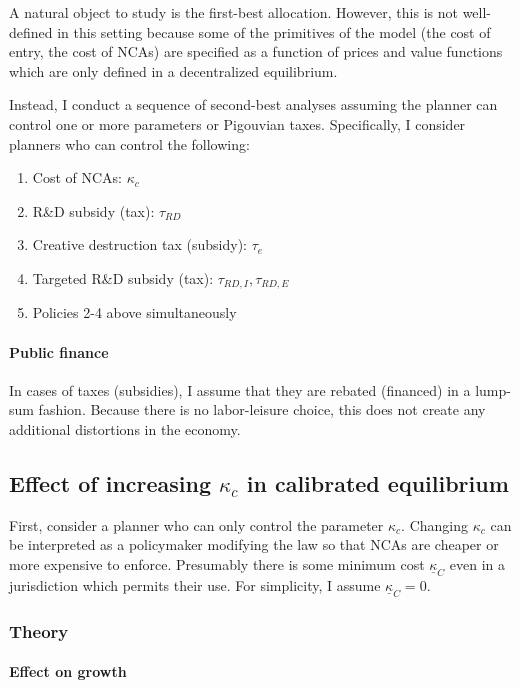\documentclass[11pt,english]{article}
\theoremstyle{remark}
\begin{document}
A natural object to study is the first-best allocation. However, this is not well-defined in this setting because some of the primitives of the model (the cost of entry, the cost of NCAs) are specified as a function of prices and value functions which are only defined in a decentralized equilibrium.

Instead, I conduct a sequence of second-best analyses assuming the planner can control one or more parameters or Pigouvian taxes. Specifically, I consider planners who can control the following: 

\begin{enumerate}
	\item Cost of NCAs: $\kappa_c$ 
	\item R\&D subsidy (tax): $\tau_{RD}$
	\item Creative destruction tax (subsidy): $\tau_e$
	\item Targeted R\&D subsidy (tax): $\tau_{RD,I}, \tau_{RD,E}$
	\item Policies 2-4 above simultaneously
\end{enumerate}

\paragraph{Public finance} 

In cases of taxes (subsidies), I assume that they are rebated (financed) in a lump-sum fashion. Because there is no labor-leisure choice, this does not create any additional distortions in the economy. 

\subsection{Effect of increasing $\kappa_c$ in calibrated equilibrium} 

First, consider a planner who can only control the parameter $\kappa_c$. Changing $\kappa_c$ can be interpreted as a policymaker modifying the law so that NCAs are cheaper or more expensive to enforce. Presumably there is some minimum cost $\underline{\kappa}_C$ even in a jurisdiction which permits their use. For simplicity, I assume $\underline{\kappa}_C = 0$.


\subsubsection{Theory}

\paragraph{Effect on growth}
\end{document}
